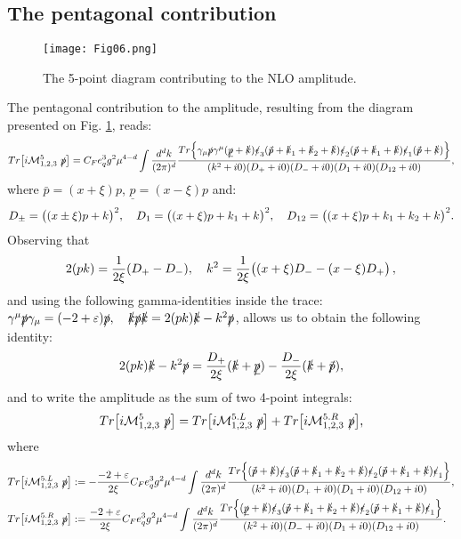 \documentclass[aps,prd,superscriptaddress,floatfix,showpacs]{revtex4}
\begin{document}
\subsection{The pentagonal contribution}
\begin{figure}[h]
\texttt{[image: Fig06.png]}
    \caption{The 5-point diagram contributing to the NLO amplitude.}
    \label{5}
\end{figure}
The pentagonal contribution to the amplitude, resulting from the diagram presented on Fig. \ref{5}, reads:
\begin{equation}
Tr\big[ i\mathcal{M}^5_{1,2,3}~ \slashed{p} \big] = C_F e_q^3 g^2 \mu^{4-d} \int \frac{d^d k}{(2\pi)^d} \frac{Tr\Big{\{} \gamma_\mu \slashed{p} \gamma^\mu (\slashed{\underline{p}} + \slashed{k})\slashed{\epsilon}_3(\slashed{\bar{p}} + \slashed{k}_1 + \slashed{k}_2 + \slashed{k})\slashed{\epsilon}_2 (\slashed{\bar{p}} + \slashed{k}_1 + \slashed{k}) \slashed{\epsilon}_1 (\slashed{\bar{p}} + \slashed{k}) \Big{\}}}{(k^2+i0)(D_+ +i0)(D_{-} +i0)(D_1+i0) (D_{12}+i0)},
\end{equation}
where $\bar{p} = (x+\xi)p$, $\underline{p} = (x-\xi)p$ and:
$$
D_{\pm} = \big{(} (x\pm \xi)p + k  \big{)}^2, \quad D_{1} = \big{(} (x + \xi)p + k_1 + k  \big{)}^2, \quad D_{12} = \big{(} (x + \xi)p + k_1 + k_2 + k  \big{)}^2.
$$
Observing that
$$
2(pk) = \frac{1}{2\xi} (D_+ - D_{-} ), \quad k^2 = \frac{1}{2\xi} \big{(} (x+\xi)D_{-} - (x-\xi)D_+ \big{)}\,,
$$
and using the following gamma-identities inside the trace:
$
\gamma^\mu \slashed{p} \gamma_\mu = (-2 + \varepsilon) \slashed{p}, \quad \slashed{k} \slashed{p} \slashed{k} = 2(pk) \slashed{k} - k^2 \slashed{p}
$, allows us to obtain the following identity:
\begin{equation}
2(pk) \slashed{k} - k^2 \slashed{p} = \frac{D_+}{2\xi} (\slashed{k}+\slashed{\underline{p}}) - \frac{D_{-}}{2\xi} (\slashed{k} + \slashed{\bar{p}}),
\end{equation}
and to write the  amplitude  as the sum of two 4-point integrals:
\begin{equation}
Tr\big[ i\mathcal{M}^5_{1,2,3}~\slashed{p}\big] = Tr\big[ i\mathcal{M}^{5.L}_{1,2,3}~\slashed{p} \big] + Tr\big[ i\mathcal{M}^{5.R}_{1,2,3}~\slashed{p} \big] ,
\end{equation}
where
\begin{align}
&Tr\big[ i\mathcal{M}^{5.L}_{1,2,3}~ \slashed{p}\big] := - \frac{-2+\varepsilon}{2\xi}C_F e_q^3 g^2 \mu^{4-d} \int \frac{d^d k}{(2\pi)^d} \frac{Tr\Big{\{} (\slashed{\bar{p}} + \slashed{k})\slashed{\epsilon}_3(\slashed{\bar{p}} + \slashed{k}_1 + \slashed{k}_2 + \slashed{k})\slashed{\epsilon}_2 (\slashed{\bar{p}} + \slashed{k}_1 + \slashed{k}) \slashed{\epsilon}_1 \Big{\}}}{(k^2+i0)(D_{+} +i0)(D_1+i0) (D_{12}+i0)}, \label{eq-M-5-split}
\\
&Tr\big[ i\mathcal{M}^{5.R}_{1,2,3}~\slashed{p} \big] := \frac{-2+\varepsilon}{2\xi}C_F e_q^3 g^2 \mu^{4-d} \int \frac{d^d k}{(2\pi)^d} \frac{Tr\Big{\{} (\slashed{\underline{p}} + \slashed{k})\slashed{\epsilon}_3(\slashed{\bar{p}} + \slashed{k}_1 + \slashed{k}_2 + \slashed{k})\slashed{\epsilon}_2 (\slashed{\bar{p}} + \slashed{k}_1 + \slashed{k}) \slashed{\epsilon}_1 \Big{\}}}{(k^2+i0)(D_{-} +i0)(D_1+i0) (D_{12}+i0)}.
\end{align}
\end{document}

